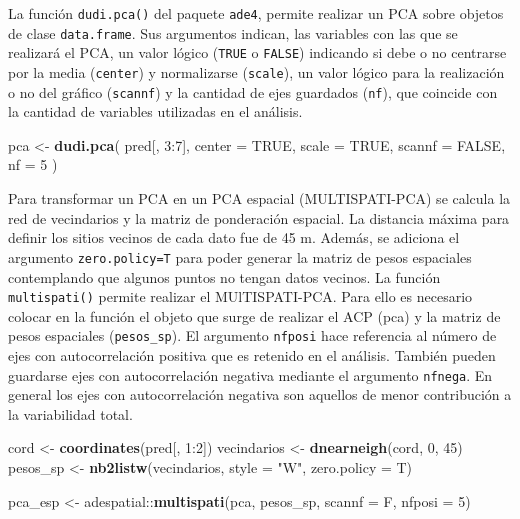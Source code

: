 \documentclass[11pt,b5paper,]{krantz}
\newenvironment{Shaded}{}{}
\newcommand{\KeywordTok}[1]{\textcolor[rgb]{0.00,0.44,0.13}{\textbf{#1}}}
\newcommand{\DataTypeTok}[1]{\textcolor[rgb]{0.56,0.13,0.00}{#1}}
\newcommand{\DecValTok}[1]{\textcolor[rgb]{0.25,0.63,0.44}{#1}}
\newcommand{\StringTok}[1]{\textcolor[rgb]{0.25,0.44,0.63}{#1}}
\newcommand{\OtherTok}[1]{\textcolor[rgb]{0.00,0.44,0.13}{#1}}
\newcommand{\OperatorTok}[1]{\textcolor[rgb]{0.40,0.40,0.40}{#1}}
\newcommand{\NormalTok}[1]{#1}
\begin{document}
La función \texttt{dudi.pca()} del paquete \texttt{ade4}, permite
realizar un PCA sobre objetos de clase \texttt{data.frame}. Sus
argumentos indican, las variables con las que se realizará el PCA, un
valor lógico (\texttt{TRUE} o \texttt{FALSE}) indicando si debe o no
centrarse por la media (\texttt{center}) y normalizarse
(\texttt{scale}), un valor lógico para la realización o no del gráfico
(\texttt{scannf}) y la cantidad de ejes guardados (\texttt{nf}), que
coincide con la cantidad de variables utilizadas en el análisis.

\begin{Shaded}
\begin{Highlighting}[]
\NormalTok{pca <-}
\StringTok{  }\KeywordTok{dudi.pca}\NormalTok{(}
\NormalTok{    pred[, }\DecValTok{3}\OperatorTok{:}\DecValTok{7}\NormalTok{],}
    \DataTypeTok{center =} \OtherTok{TRUE}\NormalTok{,}
    \DataTypeTok{scale =} \OtherTok{TRUE}\NormalTok{,}
    \DataTypeTok{scannf =} \OtherTok{FALSE}\NormalTok{,}
    \DataTypeTok{nf =} \DecValTok{5}
\NormalTok{  )}
\end{Highlighting}
\end{Shaded}

Para transformar un PCA en un PCA espacial (MULTISPATI-PCA) se calcula
la red de vecindarios y la matriz de ponderación espacial. La distancia
máxima para definir los sitios vecinos de cada dato fue de 45 m. Además,
se adiciona el argumento \texttt{zero.policy=T} para poder generar la
matriz de pesos espaciales contemplando que algunos puntos no tengan
datos vecinos. La función \texttt{multispati()} permite realizar el
MUlTISPATI-PCA. Para ello es necesario colocar en la función el objeto
que surge de realizar el ACP (pca) y la matriz de pesos espaciales
(\texttt{pesos\_sp}). El argumento \texttt{nfposi} hace referencia al
número de ejes con autocorrelación positiva que es retenido en el
análisis. También pueden guardarse ejes con autocorrelación negativa
mediante el argumento \texttt{nfnega}. En general los ejes con
autocorrelación negativa son aquellos de menor contribución a la
variabilidad total.

\begin{Shaded}
\begin{Highlighting}[]
\NormalTok{cord <-}\StringTok{ }\KeywordTok{coordinates}\NormalTok{(pred[, }\DecValTok{1}\OperatorTok{:}\DecValTok{2}\NormalTok{])}
\NormalTok{vecindarios <-}\StringTok{ }\KeywordTok{dnearneigh}\NormalTok{(cord, }\DecValTok{0}\NormalTok{, }\DecValTok{45}\NormalTok{)}
\NormalTok{pesos_sp <-}\StringTok{ }\KeywordTok{nb2listw}\NormalTok{(vecindarios, }
                     \DataTypeTok{style =} \StringTok{"W"}\NormalTok{, }
                     \DataTypeTok{zero.policy =}\NormalTok{ T)}

\NormalTok{pca_esp <-}
\StringTok{  }\NormalTok{adespatial}\OperatorTok{::}\KeywordTok{multispati}\NormalTok{(pca, pesos_sp, }
                         \DataTypeTok{scannf =}\NormalTok{ F, }\DataTypeTok{nfposi =} \DecValTok{5}\NormalTok{)}
\end{Highlighting}
\end{Shaded}
\end{document}
